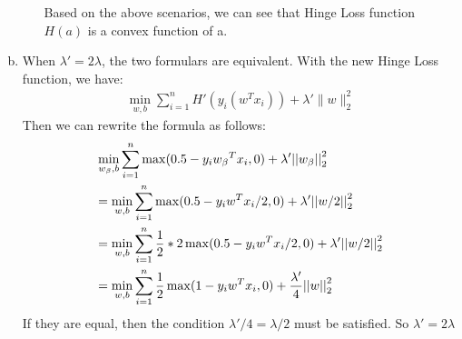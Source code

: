 \documentclass[letterpaper,11pt]{article}
\begin{document}
\begin{enumerate}[(a)]
\begin{enumerate}
Based on the above scenarios, we can see that Hinge Loss function $H(a)$ is a convex function of a.

\end{enumerate}
\item \begin{enumerate}
When $\lambda ' = 2\lambda$, the two formulars are equivalent. With the new Hinge Loss function, we have: 
\begin{eqnarray}
\min_{w,b}\sum_{i=1}^n H'(y_i(w^Tx_i)) + \lambda'\|w\|_2^2
\end{eqnarray}
Then we can rewrite the formula as follows:
\begin{eqnarray}
\begin{gathered}
  {\min _{{w_\beta },b}}\sum\limits_{i = 1}^n {\max (0.5 - {y_i}{w_\beta }^T{x_i},0)}  + \lambda '{\rm{||}}{w_\beta }{\rm{||}}_2^2 \hfill \\
   = {\min _{w,b}}\sum\limits_{i = 1}^n {\max (0.5 - {y_i}{w^T}{x_i}/2,0)}  + \lambda '{\rm{||}}{w/2}{\rm{||}}_2^2 \hfill \\
   = {\min _{w,b}}\sum\limits_{i = 1}^n {\frac{1}{2}*2\max (0.5 - {y_i}{w^T}{x_i}/2,0)}  + \lambda '{\rm{||}}{w/2}{\rm{||}}_2^2 \hfill \\
   = {\min _{w,b}}\sum\limits_{i = 1}^n {\frac{1}{2}\max (1 - {y_i}{w^T}{x_i},0)}  + \frac{{\lambda '}}{4}{\rm{||}}w{\rm{||}}_2^2 \hfill \\
\end{gathered}
\end{eqnarray}
If they are equal, then the condition $\lambda '/4 = \lambda /2$ must be satisfied. So $\lambda ' = 2\lambda$

\end{enumerate}
\end{enumerate}
\end{document}
